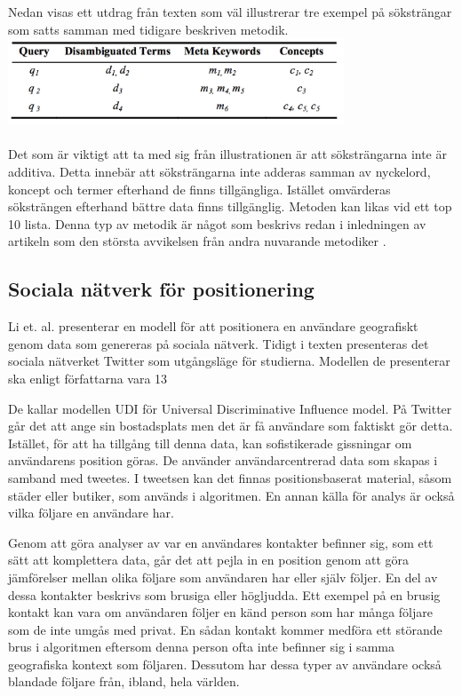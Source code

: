 \documentclass[a4paper,11pt]{article}
\begin{document}
{Nedan visas ett utdrag från texten som väl illustrerar tre exempel på söksträngar som satts samman med tidigare beskriven metodik. \\

\includegraphics[width=10cm]{img1.png} \\\\
Det som är viktigt att ta med sig från illustrationen är att söksträngarna inte är additiva. Detta innebär att söksträngarna inte adderas samman av nyckelord, koncept och termer efterhand de finns tillgängliga. Istället omvärderas söksträngen efterhand bättre data finns tillgänglig. Metoden kan likas vid ett top 10 lista. Denna typ av metodik är något som beskrivs redan i inledningen av artikeln som den största avvikelsen från andra nuvarande metodiker \cite{Limbu}.


\subsection{Sociala nätverk för positionering}
Li et. al. \cite{Rui} presenterar en modell för att positionera en användare geografiskt genom data som genereras på sociala nätverk. Tidigt i texten presenteras det sociala nätverket Twitter som utgångsläge för studierna. Modellen de presenterar ska enligt författarna vara 13%

De kallar modellen UDI för Universal Discriminative Influence model. På Twitter går det att ange sin bostadsplats men det är få användare som faktiskt gör detta. Istället, för att ha tillgång till denna data, kan sofistikerade gissningar om användarens position göras. De använder användarcentrerad data som skapas i samband med tweetes. I tweetsen kan det finnas positionsbaserat material, såsom städer eller butiker, som används i algoritmen. En annan källa för analys är också vilka följare en användare har.

Genom att göra analyser av var en användares kontakter befinner sig, som ett sätt att komplettera data, går det att pejla in en position genom att göra jämförelser mellan olika följare som användaren har eller själv följer. En del av dessa kontakter beskrivs som brusiga eller högljudda. Ett exempel på en brusig kontakt kan vara om användaren följer en känd person som har många följare som de inte umgås med privat. En sådan kontakt kommer medföra ett störande brus i algoritmen eftersom denna person ofta inte befinner sig i samma geografiska kontext som följaren. Dessutom har dessa typer av användare också blandade följare från, ibland, hela världen.

}
\end{document}
